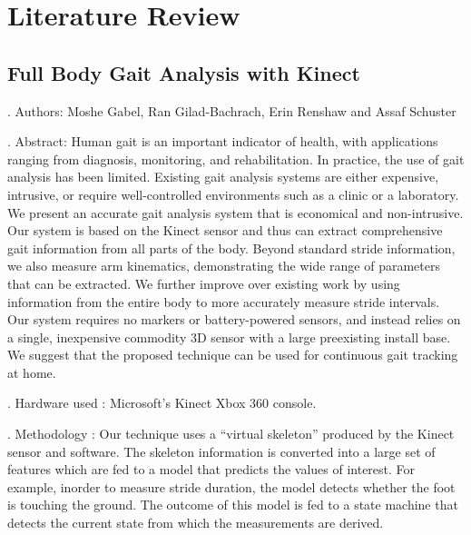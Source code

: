 \chapter{Literature Review} \label{Literature Review}
\section{Full Body Gait Analysis with Kinect} \label{Full Body Gait Analysis with Kinect}
. Authors:
\noindent Moshe Gabel, Ran Gilad-Bachrach, Erin Renshaw and Assaf Schuster

. Abstract:
\noindent Human gait is an important indicator of health, with applications ranging from diagnosis, monitoring, and rehabilitation. In practice, the use of gait analysis has been limited. Existing gait analysis systems are either expensive, intrusive, or require well-controlled environments such as a clinic or a laboratory. We present an accurate gait analysis system that is economical and non-intrusive. Our system is based on the Kinect sensor and thus can extract comprehensive gait information from all parts of the body. Beyond standard stride information, we also measure arm kinematics, demonstrating the wide range of parameters that can be extracted. We further improve over existing work by using information from the entire body to more accurately measure stride intervals. Our system requires no markers or battery-powered sensors, and instead relies on a single, inexpensive commodity 3D sensor with a large preexisting install base. We suggest that the proposed technique can be used for continuous gait tracking at home.

. Hardware used :
\noindent Microsoft’s Kinect Xbox 360 console.

. Methodology :
\noindent Our technique uses a “virtual skeleton” produced by the Kinect sensor and software. The skeleton information is converted into a large set of features which are fed to a model that predicts the values of interest. For example, inorder to measure stride duration, the model detects whether the foot is touching the ground. The outcome of this model is fed to a state machine that detects the current state from which the measurements are derived.

